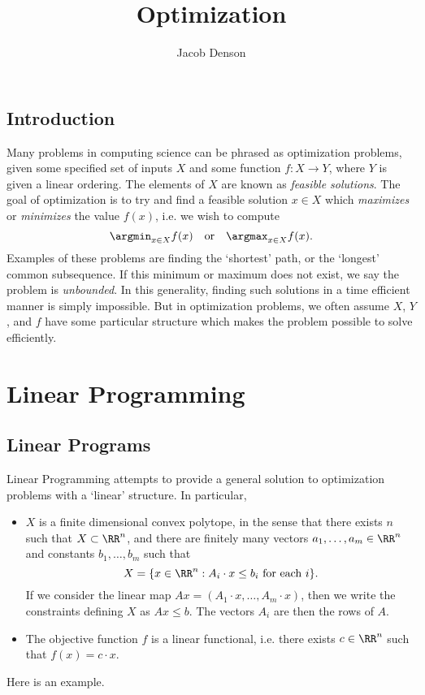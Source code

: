

\title{Optimization}
\author{Jacob Denson}



\maketitle
\tableofcontents
{}

\chapter{Introduction}

Many problems in computing science can be phrased as optimization problems, given some specified set of inputs $X$ and some function $f: X \to Y$, where $Y$ is given a linear ordering. The elements of $X$ are known as \emph{feasible solutions}. The goal of optimization is to try and find a feasible solution $x \in X$ which \emph{maximizes} or \emph{minimizes} the value $f(x)$, i.e. we wish to compute
%
\[ \argmin_{x \in X} f(x)\quad\text{or}\quad\argmax_{x \in X} f(x). \]
%  
Examples of these problems are finding the `shortest' path, or the `longest' common subsequence. If this minimum or maximum does not exist, we say the problem is \emph{unbounded}. In this generality, finding such solutions in a time efficient manner is simply impossible. But in optimization problems, we often assume $X$, $Y$, and $f$ have some particular structure which makes the problem possible to solve efficiently.

\part{Linear Programming}

\chapter{Linear Programs}

Linear Programming attempts to provide a general solution to optimization problems with a `linear' structure. In particular,
%
\begin{itemize}
    \item $X$ is a finite dimensional convex polytope, in the sense that there exists $n$ such that $X \subset \RR^n$, and there are finitely many vectors $a_1, \dots, a_m \in \RR^n$ and constants $b_1, \dots, b_m$ such that
    \[ X = \{ x \in \RR^n: A_i \cdot x \leq b_i\ \text{for each $i$} \}. \]
    If we consider the linear map $Ax = (A_1 \cdot x, \dots, A_m \cdot x)$, then we write the constraints defining $X$ as $Ax \leq b$. The vectors $A_i$ are then the rows of $A$.

    \item The objective function $f$ is a linear functional, i.e. there exists $c \in \RR^n$ such that $f(x) = c \cdot x$.
\end{itemize}
%
Here is an example.


